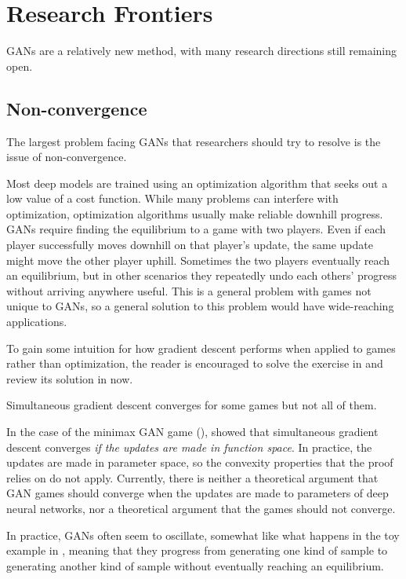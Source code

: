 \section{Research Frontiers}

GANs are a relatively new method, with many research directions still
remaining open.

\subsection{Non-convergence}

The largest problem facing GANs that researchers should try to resolve is the issue
of non-convergence.

Most deep models are trained using an optimization algorithm that seeks out a low
value of a cost function.
While many problems can interfere with optimization, optimization algorithms usually
make reliable downhill progress.
GANs require finding the equilibrium to a game with two players.
Even if each player successfully moves downhill on that player's update,
the same update might move the other player uphill.
Sometimes the two players eventually reach an equilibrium, but in other scenarios
they repeatedly undo each others' progress without arriving anywhere useful.
This is a general problem with games not unique to GANs, so a general solution
to this problem would have wide-reaching applications.

To gain some intuition for how gradient descent performs when applied to games
rather than optimization, the reader is encouraged to solve the exercise in
 and review its solution in  now.

Simultaneous gradient descent converges for some games but not all of them.

In the case of the minimax GAN game (),
\citet{Goodfellow-et-al-NIPS2014-small} showed that simultaneous gradient
descent converges {\em if the updates are made in function space}.
In practice, the updates are made in parameter space, so the convexity
properties that the proof relies on do not apply.
Currently, there is neither a theoretical argument that GAN games should
converge when the updates are made to parameters of deep neural networks,
nor a theoretical argument that the games should not converge.

In practice, GANs often seem to oscillate, somewhat like what happens in
the toy example in , meaning that they progress from
generating one kind of sample to generating another kind of sample without
eventually reaching an equilibrium.

